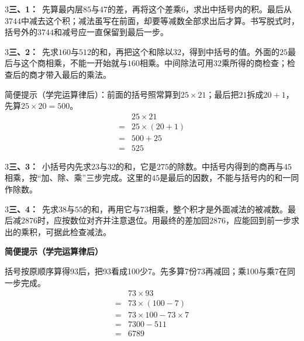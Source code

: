 \documentclass[multi=snippet,border={5bp 20bp 5bp 5bp}]{standalone}
\newenvironment{snippet}[3]{\begin{minipage}{#1bp}\color{answerred}\fontsize{#2}{#3}\selectfont\raggedright}{\end{minipage}}
\begin{document}
\begin{snippet}{505}{11.5}{14}\begin{multicols}{3}\raggedcolumns \textbf{三、1：}\ 先算最内层\(85\)\allowbreak 与\(47\)\allowbreak 的差，再将这个差乘\(6\)\allowbreak ，求出中括号内的积。最后从\(3744\)\allowbreak 中减去这个积；减法虽写在前面，却要等减数全部求出后才算。书写脱式时，括号外的\(3744\)\allowbreak 和减号应一直保留到最后一步。\end{multicols}\end{snippet}
\begin{snippet}{505}{11.5}{14}\begin{multicols}{3}\raggedcolumns \textbf{三、2：}\ 先求\(160\)\allowbreak 与\(512\)\allowbreak 的和，再把这个和除以\(32\)\allowbreak ，得到中括号的值。外面的\(25\)\allowbreak 最后与这个商相乘，不能一开始就与\(160\)\allowbreak 相乘。中间除法可用\(32\)\allowbreak 乘所得的商检查；检查后的商才带入最后的乘法。\par 简便提示（学完运算律后）：前面的括号照常算到\(25\times21\)\allowbreak ；最后把\(21\)\allowbreak 拆成\(20+1\)\allowbreak ，先算\(25\times20=500\)\allowbreak 。\[\begin{aligned}&25\times21\\={}&25\times(20+1)\\={}&500+25\\={}&525\end{aligned}\]\end{multicols}\end{snippet}
\begin{snippet}{505}{11.5}{14}\begin{multicols}{3}\raggedcolumns \textbf{三、3：}\ 小括号内先求\(23\)\allowbreak 与\(32\)\allowbreak 的和，它是\(275\)\allowbreak 的除数。中括号内得到的商再与\(45\)\allowbreak 相乘，按“加、除、乘”三步完成。这里的\(45\)\allowbreak 是最后的因数，不能与括号内的和一同作除数。\end{multicols}\end{snippet}
\begin{snippet}{505}{11.5}{14}\begin{multicols}{3}\raggedcolumns \textbf{三、4：}\ 先求\(38\)\allowbreak 与\(55\)\allowbreak 的和，再用它与\(73\)\allowbreak 相乘，整个积才是外面减法的被减数。最后减\(2876\)\allowbreak 时，应按数位对齐并注意退位。用最终的差加回\(2876\)\allowbreak ，应能回到前一步求出的乘积，可据此检查减法。\par\textbf{简便提示（学完运算律后）}\par 括号按原顺序算得93后，把93看成100少7。先多算7份73再减回；乘100与乘7在同一步完成。\[\begin{aligned}&73\times93\\={}&73\times(100-7)\\={}&73\times100-73\times7\\={}&7300-511\\={}&6789\end{aligned}\]\end{multicols}\end{snippet}
\end{document}
